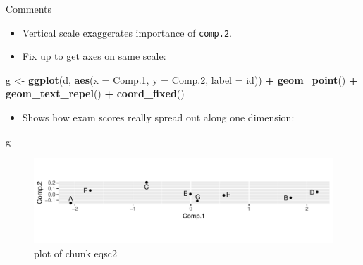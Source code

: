 \documentclass[ignorenonframetext,]{beamer}
\newenvironment{Shaded}{\begin{snugshade}}{\end{snugshade}}
\newcommand{\DataTypeTok}[1]{\textcolor[rgb]{0.13,0.29,0.53}{#1}}
\newcommand{\FloatTok}[1]{\textcolor[rgb]{0.00,0.00,0.81}{#1}}
\newcommand{\KeywordTok}[1]{\textcolor[rgb]{0.13,0.29,0.53}{\textbf{#1}}}
\newcommand{\NormalTok}[1]{#1}
\newcommand{\OperatorTok}[1]{\textcolor[rgb]{0.81,0.36,0.00}{\textbf{#1}}}
\newcommand{\StringTok}[1]{\textcolor[rgb]{0.31,0.60,0.02}{#1}}
\providecommand{\tightlist}{%
  \setlength{\itemsep}{0pt}\setlength{\parskip}{0pt}}
\begin{document}
\begin{frame}[fragile]{Comments}
\protect\hypertarget{comments-28}{}

\begin{itemize}
\item
  Vertical scale exaggerates importance of \texttt{comp.2}.
\item
  Fix up to get axes on same scale:
\end{itemize}

\begin{Shaded}
\begin{Highlighting}[]
\NormalTok{g <-}\StringTok{ }\KeywordTok{ggplot}\NormalTok{(d, }\KeywordTok{aes}\NormalTok{(}\DataTypeTok{x =}\NormalTok{ Comp}\FloatTok{.1}\NormalTok{, }\DataTypeTok{y =}\NormalTok{ Comp}\FloatTok{.2}\NormalTok{, }\DataTypeTok{label =}\NormalTok{ id)) }\OperatorTok{+}
\StringTok{  }\KeywordTok{geom_point}\NormalTok{() }\OperatorTok{+}\StringTok{ }\KeywordTok{geom_text_repel}\NormalTok{() }\OperatorTok{+}
\StringTok{  }\KeywordTok{coord_fixed}\NormalTok{()}
\end{Highlighting}
\end{Shaded}

\begin{itemize}
\tightlist
\item
  Shows how exam scores really spread out along one dimension:
\end{itemize}

\begin{Shaded}
\begin{Highlighting}[]
\NormalTok{g}
\end{Highlighting}
\end{Shaded}

\begin{figure}
\centering
\includegraphics{figure/eqsc2-1.pdf}
\caption{plot of chunk eqsc2}
\end{figure}

\end{frame}
\end{document}
